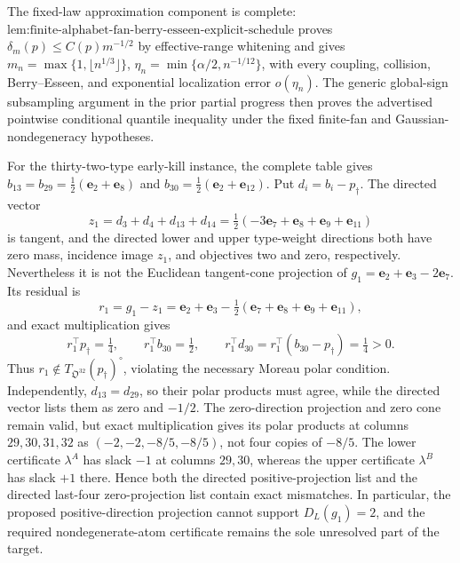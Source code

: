 The fixed-law approximation component is complete: \(\text{lem:finite-alphabet-fan-berry-esseen-explicit-schedule}\) proves \(\delta_m(p)\leq C(p)m^{-1/2}\) by effective-range whitening and gives \(m_n=\max\{1,\lfloor n^{1/3}\rfloor\}\), \(\eta_n=\min\{\alpha/2,n^{-1/12}\}\), with every coupling, collision, Berry--Esseen, and exponential localization error \(o(\eta_n)\).  The generic global-sign subsampling argument in the prior partial progress then proves the advertised pointwise conditional quantile inequality under the fixed finite-fan and Gaussian-nondegeneracy hypotheses.

For the thirty-two-type early-kill instance, the complete table gives \(b_{13}=b_{29}=\tfrac12(\mathbf e_2+\mathbf e_8)\) and \(b_{30}=\tfrac12(\mathbf e_2+\mathbf e_{12})\).  Put \(d_i=b_i-p_\dagger\).  The directed vector
\[
z_1=d_3+d_4+d_{13}+d_{14}
=\tfrac12(-3\mathbf e_7+\mathbf e_8+\mathbf e_9+\mathbf e_{11})
\]
is tangent, and the directed lower and upper type-weight directions both have zero mass, incidence image \(z_1\), and objectives two and zero, respectively.  Nevertheless it is not the Euclidean tangent-cone projection of \(g_1=\mathbf e_2+\mathbf e_3-2\mathbf e_7\).  Its residual is
\[
r_1=g_1-z_1
=\mathbf e_2+\mathbf e_3-\tfrac12(\mathbf e_7+\mathbf e_8+\mathbf e_9+\mathbf e_{11}),
\]
and exact multiplication gives
\[
r_1^{\top}p_\dagger=\tfrac14,\qquad
r_1^{\top}b_{30}=\tfrac12,\qquad
r_1^{\top}d_{30}
=r_1^{\top}(b_{30}-p_\dagger)=\tfrac14>0.
\]
Thus \(r_1\notin T_{\mathfrak O^{32}}(p_\dagger)^\circ\), violating the necessary Moreau polar condition.  Independently, \(d_{13}=d_{29}\), so their polar products must agree, while the directed vector lists them as zero and \(-1/2\).  The zero-direction projection and zero cone remain valid, but exact multiplication gives its polar products at columns \(29,30,31,32\) as \((-2,-2,-8/5,-8/5)\), not four copies of \(-8/5\).  The lower certificate \(\lambda^A\) has slack \(-1\) at columns \(29,30\), whereas the upper certificate \(\lambda^B\) has slack \(+1\) there.  Hence both the directed positive-projection list and the directed last-four zero-projection list contain exact mismatches.  In particular, the proposed positive-direction projection cannot support \(D_L(g_1)=2\), and the required nondegenerate-atom certificate remains the sole unresolved part of the target.